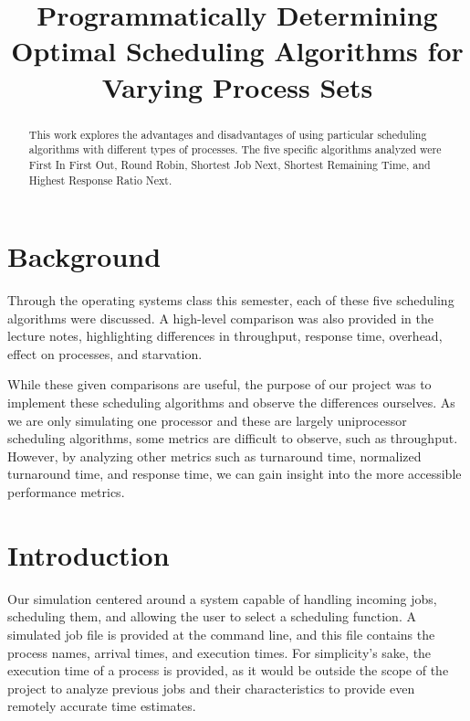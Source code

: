 \documentclass[conference,11pt]{IEEEtran}
\begin{document}
%
\title{Programmatically Determining Optimal Scheduling Algorithms for Varying Process Sets}

\author{
}

\maketitle

\begin{abstract}
This work explores the advantages and disadvantages of using particular scheduling algorithms with different types of processes. The five specific algorithms analyzed were First In First Out, Round Robin, Shortest Job Next, Shortest Remaining Time, and Highest Response Ratio Next.
\end{abstract}

\section{Background}
Through the operating systems class this semester, each of these five scheduling algorithms were discussed. A high-level comparison was also provided in the lecture notes, highlighting differences in throughput, response time, overhead, effect on processes, and starvation.

While these given comparisons are useful, the purpose of our project was to implement these scheduling algorithms and observe the differences ourselves. As we are only simulating one processor and these are largely uniprocessor scheduling algorithms, some metrics are difficult to observe, such as throughput. However, by analyzing other metrics such as turnaround time, normalized turnaround time, and response time, we can gain insight into the more accessible performance metrics.

\section{Introduction}
Our simulation centered around a system capable of handling incoming jobs, scheduling them, and allowing the user to select a scheduling function. A simulated job file is provided at the command line, and this file contains the process names, arrival times, and execution times. For simplicity's sake, the execution time of a process is provided, as it would be outside the scope of the project to analyze previous jobs and their characteristics to provide even remotely accurate time estimates.
\end{document}
